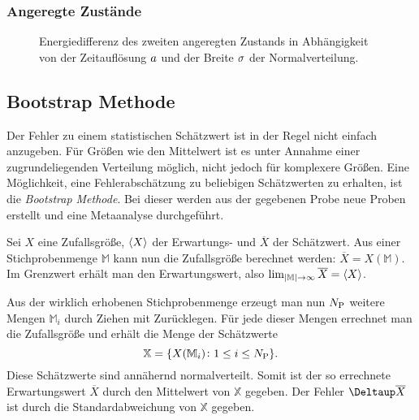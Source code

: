 \FloatBarrier
\subsection{Angeregte Zustände}

\begin{figure}[htbp]
    \centering
    \caption{%
        Energiedifferenz des zweiten angeregten Zustands in Abhängigkeit von
        der Zeitauflösung $a$ und der Breite $\sigma$ der
        Normalverteilung.
    }
    \label{fig:mesh-e2-e0}
\end{figure}

\begin{appendix}
    \chapter{Bootstrap Methode}

    Der Fehler zu einem statistischen Schätzwert ist in der Regel nicht einfach
    anzugeben. Für Größen wie den Mittelwert ist es unter Annahme einer
    zugrundeliegenden Verteilung möglich, nicht jedoch für komplexere Größen.
    Eine Möglichkeit, eine Fehlerabschätzung zu beliebigen Schätzwerten zu
    erhalten, ist die \emph{Bootstrap Methode}. Bei dieser werden aus der
    gegebenen Probe neue Proben erstellt und eine Metaanalyse durchgeführt.

    Sei $X$ eine Zufallsgröße, $\langle X \rangle$ der Erwartungs- und $\overline X$
    der Schätzwert. Aus einer Stichprobenmenge $\mathbb M$ kann nun die
    Zufallsgröße berechnet werden: $\overline X = X(\mathbb M)$. Im Grenzwert
    erhält man den Erwartungswert, also $\lim_{|\mathbb M| \to \infty}
    \overline X = \langle X \rangle$.

    Aus der wirklich erhobenen Stichprobenmenge erzeugt man nun
    $N_\text P$ weitere Mengen $\mathbb M_i$ durch Ziehen mit
    Zurücklegen. Für jede dieser Mengen errechnet man die Zufallsgröße und
    erhält die Menge der Schätzwerte
    \[
        \mathbb X = \{ X(\mathbb M_i) \colon 1 \leq i \leq N_\text P \}.
    \]
    Diese Schätzwerte sind annähernd normalverteilt. Somit ist der so
    errechnete Erwartungswert $\overline X$ durch den Mittelwert von $\mathbb
    X$ gegeben. Der Fehler $\Deltaup \overline X$ ist durch die
    Standardabweichung von $\mathbb X$ gegeben.
\end{appendix}

